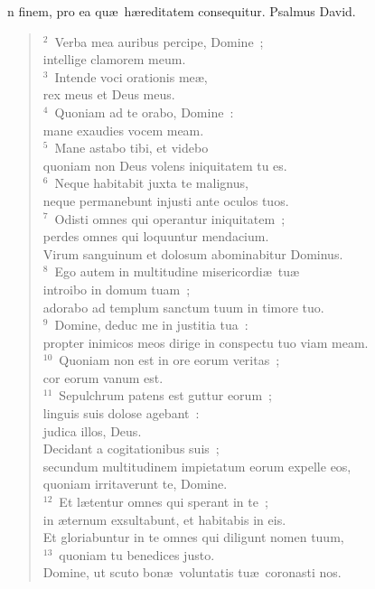 \bchapter
{}n finem, pro ea qu\ae\ h\ae reditatem consequitur. Psalmus David.
\begin{flushleft}\begin{verse}\vspace{6pt}${}^{2}$~Verba mea auribus percipe, Domine~;\\ intellige clamorem meum.\\
${}^{3}$~Intende voci orationis me\ae ,\\ rex meus et Deus meus.\\
${}^{4}$~Quoniam ad te orabo, Domine~:\\ mane exaudies vocem meam.\\
${}^{5}$~Mane astabo tibi, et videbo\\ quoniam non Deus volens iniquitatem tu es.\\
${}^{6}$~Neque habitabit juxta te malignus,\\ neque permanebunt injusti ante oculos tuos.\\
${}^{7}$~Odisti omnes qui operantur iniquitatem~;\\ perdes omnes qui loquuntur mendacium.\\ Virum sanguinum et dolosum abominabitur Dominus.\\
${}^{8}$~Ego autem in multitudine misericordi\ae\ tu\ae \\ introibo in domum tuam~;\\ adorabo ad templum sanctum tuum in timore tuo.\\
${}^{9}$~Domine, deduc me in justitia tua~:\\ propter inimicos meos dirige in conspectu tuo viam meam.\\
${}^{10}$~Quoniam non est in ore eorum veritas~;\\ cor eorum vanum est.\\
${}^{11}$~Sepulchrum patens est guttur eorum~;\\ linguis suis dolose agebant~:\\ judica illos, Deus.\\ Decidant a cogitationibus suis~;\\ secundum multitudinem impietatum eorum expelle eos,\\ quoniam irritaverunt te, Domine.\\
${}^{12}$~Et l\ae tentur omnes qui sperant in te~;\\ in \ae ternum exsultabunt, et habitabis in eis.\\ Et gloriabuntur in te omnes qui diligunt nomen tuum,\\
${}^{13}$~quoniam tu benedices justo.\\ Domine, ut scuto bon\ae\ voluntatis tu\ae\ coronasti nos.\end{verse}\end{flushleft}



